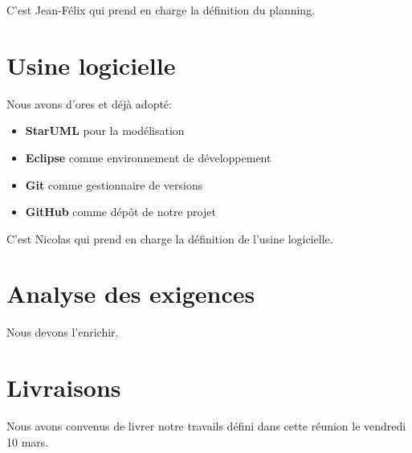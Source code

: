 \documentclass[11pt,a4paper,french,twoside,openright]{article}
\begin{document}
C'est Jean-Félix qui prend en charge la définition du planning.

\section{Usine logicielle}
Nous avons d'ores et déjà adopté:
\begin{itemize}
\item \textbf{StarUML} pour la modélisation
\item \textbf{Eclipse} comme environnement de développement
\item \textbf{Git} comme gestionnaire de versions
\item \textbf{GitHub} comme dépôt de notre projet
\end{itemize}
C'est Nicolas qui prend en charge la définition de l'usine logicielle.

\section{Analyse des exigences}
Nous devons l'enrichir.

\section{Livraisons}
Nous avons convenus de livrer notre travails défini dans cette réunion le vendredi 10 mars.

\label{LastPage}
\end{document}
